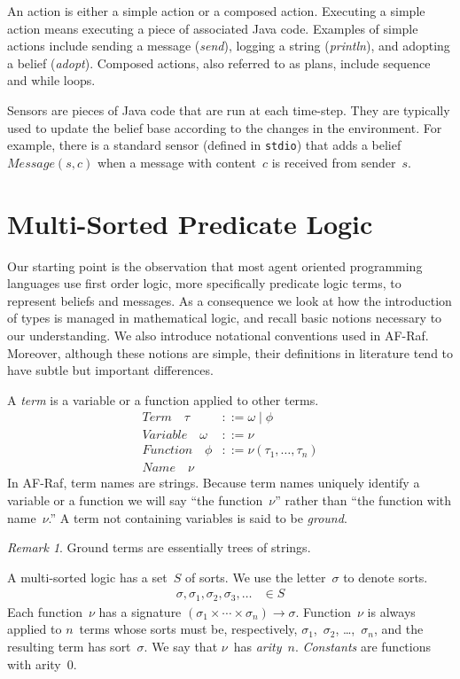 \documentclass[preprint]{sigplanconf} %
\theoremstyle{remark}
\newtheorem{remark}{Remark}
\begin{document}
An action is either a simple action or a composed action. Executing a
simple action means executing a piece of associated Java code. Examples of
simple actions include sending a message (\textit{send}), logging a string
(\textit{println}), and adopting a belief (\textit{adopt}).  Composed
actions, also referred to as plans, include sequence and while loops.

Sensors are pieces of Java code that are run at each time-step. They are
typically used to update the belief base according to the changes in the
environment. For example, there is a standard sensor (defined in
\texttt{stdio}) that adds a belief $\mathit{Message}(s,c)$ when a message
with content~$c$ is received from sender~$s$.

\section{Multi-Sorted Predicate Logic} \label{sec:multi-sorted} %

Our starting point is the observation that most agent oriented programming
languages use first order logic, more specifically predicate logic terms,
to represent beliefs and messages. As a consequence we look at how the
introduction of types is managed in mathematical logic, and recall basic
notions necessary to our understanding. We also introduce notational
conventions used in AF-Raf.  Moreover, although these notions are simple,
their definitions in literature tend to have subtle but important
differences.

A \emph{term} is a variable or a function applied to other terms.
\begin{align}
\mathit{Term}\quad\tau &::= \omega \mid \phi \\
\mathit{Variable}\quad\omega &::= \nu \\
\mathit{Function}\quad\phi &::= \nu(\tau_1,\ldots,\tau_n) \\
\mathit{Name}\quad\nu
\end{align}
In AF-Raf, term names are strings.  Because term names uniquely identify a
variable or a function we will say ``the function~$\nu$'' rather than ``the
function with name~$\nu$.'' A term not containing variables is said to be
\emph{ground}.

\begin{remark}
Ground terms are essentially trees of strings.
\end{remark}

A multi-sorted logic has a set~$S$ of sorts.  We use the letter~$\sigma$ to
denote sorts.
\begin{align}
\sigma, \sigma_1, \sigma_2, \sigma_3, \ldots &\in S
\end{align}
Each function~$\nu$ has a signature
$(\sigma_1\times\cdots\times\sigma_n)\to\sigma$.  Function~$\nu$ is always
applied to $n$~terms whose sorts must be, respectively,
$\sigma_1$,~$\sigma_2$, \dots,~$\sigma_n$, and the resulting term has
sort~$\sigma$. We say that $\nu$~has \emph{arity}~$n$. \emph{Constants} are
functions with arity~$0$.
\end{document}
